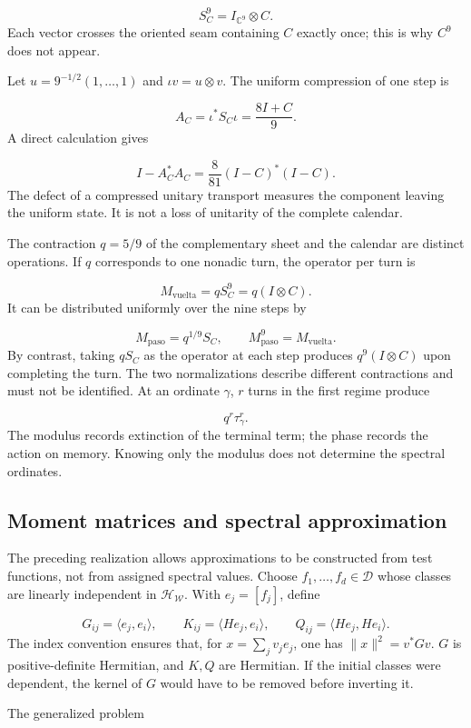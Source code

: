 \[
S_C^9=I_{\mathbb C^9}\otimes C.
\]
Each vector crosses the oriented seam containing \(C\) exactly once; this is why \(C^9\) does not appear.

Let \(u=9^{-1/2}(1,\ldots,1)\) and \(\iota v=u\otimes v\). The uniform compression of one step is

\[
A_C=\iota^*S_C\iota=\frac{8I+C}{9}.
\]
A direct calculation gives

\[
I-A_C^*A_C
=\frac8{81}(I-C)^*(I-C).
\]
The defect of a compressed unitary transport measures the component leaving the uniform state. It is not a loss of unitarity of the complete calendar.

The contraction \(q=5/9\) of the complementary sheet and the calendar are distinct operations. If \(q\) corresponds to one nonadic turn, the operator per turn is

\[
M_{\mathrm{vuelta}}=qS_C^9
=q(I\otimes C).
\]
It can be distributed uniformly over the nine steps by

\[
M_{\mathrm{paso}}=q^{1/9}S_C,\qquad
M_{\mathrm{paso}}^9=M_{\mathrm{vuelta}}.
\]
By contrast, taking \(qS_C\) as the operator at each step produces \(q^9(I\otimes C)\) upon completing the turn. The two normalizations describe different contractions and must not be identified. At an ordinate \(\gamma\), \(r\) turns in the first regime produce

\[
q^r\tau_\gamma^r.
\]
The modulus records extinction of the terminal term; the phase records the action on memory. Knowing only the modulus does not determine the spectral ordinates.

\subsection{Moment matrices and spectral approximation}
\label{viii:rz:galerkin}
The preceding realization allows approximations to be constructed from test functions, not from assigned spectral values. Choose \(f_1,\ldots,f_d\in\mathcal D\) whose classes are linearly independent in \(\mathcal H_{\mathscr W}\). With \(e_j=[f_j]\), define

\[
G_{ij}=\langle e_j,e_i\rangle,\qquad
K_{ij}=\langle He_j,e_i\rangle,\qquad
Q_{ij}=\langle He_j,He_i\rangle.
\]
The index convention ensures that, for \(x=\sum_jv_je_j\), one has \(\|x\|^2=v^*Gv\). \(G\) is positive-definite Hermitian, and \(K,Q\) are Hermitian. If the initial classes were dependent, the kernel of \(G\) would have to be removed before inverting it.

The generalized problem

